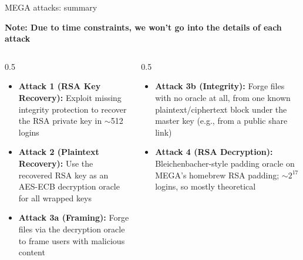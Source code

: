 \ifdefined\PRESENTATION\else\PassOptionsToClass{handout}{beamer}\fi\documentclass[aspectratio=169, lualatex]{beamer}
\begin{document}
\begin{frame}{MEGA attacks: summary}
	\begin{center}
		\textbf{Note: Due to time constraints, we won't go into the details of each attack}
	\end{center}
	\begin{columns}[c]
		\begin{column}{0.5\textwidth}
			\begin{itemize}
				\item \textbf{Attack 1 (RSA Key Recovery):} Exploit missing integrity protection to recover the RSA private key in ${\sim}$512 logins
				\item \textbf{Attack 2 (Plaintext Recovery):} Use the recovered RSA key as an AES-ECB decryption oracle for all wrapped keys
				\item \textbf{Attack 3a (Framing):} Forge files via the decryption oracle to frame users with malicious content
			\end{itemize}
		\end{column}
		\begin{column}{0.5\textwidth}
			\begin{itemize}
				\item \textbf{Attack 3b (Integrity):} Forge files with no oracle at all, from one known plaintext/ciphertext block under the master key (e.g., from a public share link)
				\item \textbf{Attack 4 (RSA Decryption):} Bleichenbacher-style padding oracle on MEGA's homebrew RSA padding; ${\sim}2^{17}$ logins, so mostly theoretical
			\end{itemize}
		\end{column}
	\end{columns}
\end{frame}
\end{document}
